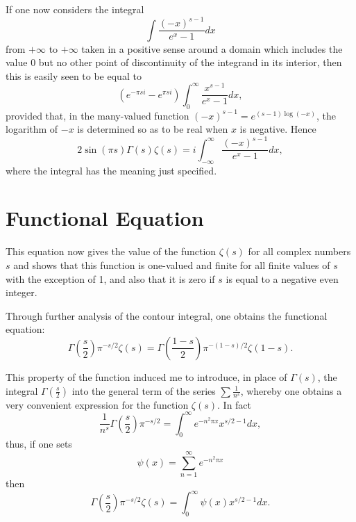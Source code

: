 \documentclass[12pt]{article}
\begin{document}
If one now considers the integral
\begin{equation}
\int \frac{(-x)^{s-1}}{e^x - 1} dx
\label{eq:contour_integral}
\end{equation}
from $+\infty$ to $+\infty$ taken in a positive sense around a domain which includes the value 0 but no other point of discontinuity of the integrand in its interior, then this is easily seen to be equal to
\begin{equation}
(e^{-\pi si} - e^{\pi si}) \int_0^{\infty} \frac{x^{s-1}}{e^x - 1} dx,
\label{eq:contour_result}
\end{equation}
provided that, in the many-valued function $(-x)^{s-1} = e^{(s-1)\log(-x)}$, the logarithm of $-x$ is determined so as to be real when $x$ is negative. Hence
\begin{equation}
2\sin(\pi s) \Gamma(s)\zeta(s) = i \int_{-\infty}^{\infty} \frac{(-x)^{s-1}}{e^x - 1} dx,
\label{eq:functional_relation_step}
\end{equation}
where the integral has the meaning just specified.

\section{Functional Equation}

This equation now gives the value of the function $\zeta(s)$ for all complex numbers $s$ and shows that this function is one-valued and finite for all finite values of $s$ with the exception of 1, and also that it is zero if $s$ is equal to a negative even integer.

Through further analysis of the contour integral, one obtains the functional equation:
\begin{equation}
\Gamma\left(\frac{s}{2}\right) \pi^{-s/2} \zeta(s) = \Gamma\left(\frac{1-s}{2}\right) \pi^{-(1-s)/2} \zeta(1-s).
\label{eq:functional_equation}
\end{equation}

This property of the function induced me to introduce, in place of $\Gamma(s)$, the integral $\Gamma\left(\frac{s}{2}\right)$ into the general term of the series $\sum \frac{1}{n^s}$, whereby one obtains a very convenient expression for the function $\zeta(s)$. In fact
\begin{equation}
\frac{1}{n^s} \Gamma\left(\frac{s}{2}\right) \pi^{-s/2} = \int_0^{\infty} e^{-n^2\pi x} x^{s/2-1} dx,
\label{eq:mellin_transform}
\end{equation}
thus, if one sets
\begin{equation}
\psi(x) = \sum_{n=1}^{\infty} e^{-n^2\pi x}
\label{eq:psi_definition}
\end{equation}
then
\begin{equation}
\Gamma\left(\frac{s}{2}\right) \pi^{-s/2} \zeta(s) = \int_0^{\infty} \psi(x) x^{s/2-1} dx.
\label{eq:zeta_psi_integral}
\end{equation}
\end{document}
